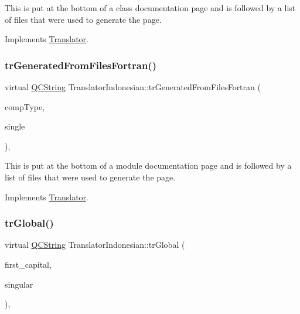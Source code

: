 This is put at the bottom of a class documentation page and is followed by a list of files that were used to generate the page. 

Implements \mbox{\hyperlink{class_translator}{Translator}}.

\mbox{\label{class_translator_indonesian_a4f3d8efd8df0357e9d17630cfc62185a}} 
\subsubsection{\texorpdfstring{trGeneratedFromFilesFortran()}{trGeneratedFromFilesFortran()}}
{\footnotesize\ttfamily virtual \mbox{\hyperlink{class_q_c_string}{Q\+C\+String}} Translator\+Indonesian\+::tr\+Generated\+From\+Files\+Fortran (\begin{DoxyParamCaption}\item[{\mbox{\hyperlink{class_class_def_ae70cf86d35fe954a94c566fbcfc87939}{Class\+Def\+::\+Compound\+Type}}}]{comp\+Type,  }\item[{bool}]{single }\end{DoxyParamCaption})\hspace{0.3cm}{\ttfamily [inline]}, {\ttfamily [virtual]}}

This is put at the bottom of a module documentation page and is followed by a list of files that were used to generate the page. 

Implements \mbox{\hyperlink{class_translator}{Translator}}.

\mbox{\label{class_translator_indonesian_ab4d7c8e6e27bc2470708ce83aace2856}} 
\subsubsection{\texorpdfstring{trGlobal()}{trGlobal()}}
{\footnotesize\ttfamily virtual \mbox{\hyperlink{class_q_c_string}{Q\+C\+String}} Translator\+Indonesian\+::tr\+Global (\begin{DoxyParamCaption}\item[{bool}]{first\+\_\+capital,  }\item[{bool}]{singular }\end{DoxyParamCaption})\hspace{0.3cm}{\ttfamily [inline]}, {\ttfamily [virtual]}}

